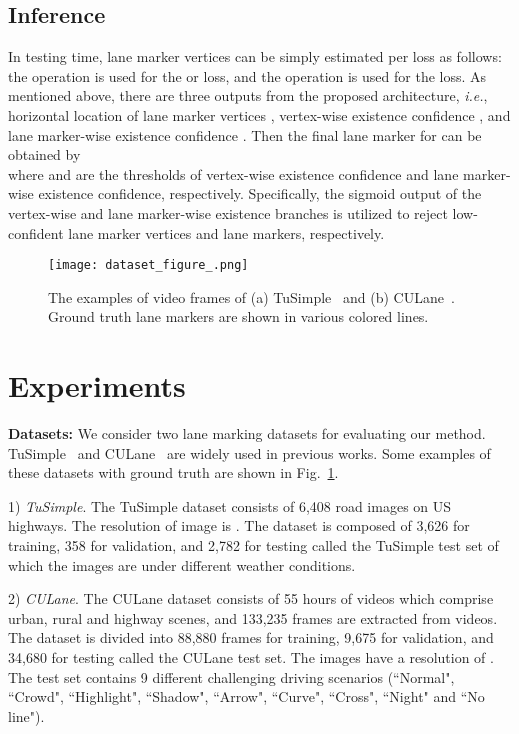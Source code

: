 \documentclass[10pt,twocolumn,letterpaper]{article}
\begin{document}
\subsection{Inference}
In testing time, lane marker vertices can be simply estimated per loss as follows: the  operation is used for the  or  loss, and the  operation is used for the  loss.
As mentioned above, there are three outputs from the proposed architecture, \textit{i.e.}, horizontal location of lane marker vertices , vertex-wise existence confidence , and lane marker-wise existence confidence . Then the final lane marker  for  can be obtained by
 \\
where  and  are the thresholds of vertex-wise existence confidence and lane marker-wise existence confidence, respectively. Specifically, the sigmoid output of the vertex-wise and lane marker-wise existence branches is utilized to reject low-confident lane marker vertices and lane markers, respectively.



\def\algorithmname{E2E-LMD}
\def\reductionname{HRM}
\def\reductionnames{HRMs}
\newcommand{\tablestyle}[2]{\setlength{\tabcolsep}{#1}\renewcommand{\arraystretch}{#2}\centering\footnotesize}

\begin{figure}[t]
	\centering
	\texttt{[image: dataset\_figure\_.png]}
	\caption{The examples of video frames of (a) TuSimple~\cite{tusimple} and (b) CULane~\cite{SpatialAsDeep}. Ground truth lane markers are shown in various colored lines.}
	\label{fig:dataset}
\end{figure}

\section{Experiments}

\textbf{Datasets:}  We consider two lane marking datasets for evaluating our method. TuSimple~\cite{tusimple} and CULane~\cite{SpatialAsDeep} are widely used in previous works. Some examples of these datasets with ground truth are shown in Fig.~\ref{fig:dataset}.

1) \textit{TuSimple}. The TuSimple dataset consists of 6,408 road images on US highways. The resolution of image is . The dataset is composed of 3,626 for training, 358 for validation, and 2,782 for testing called the TuSimple test set of which the images are under different weather conditions. 

2) \textit{CULane}. The CULane dataset consists of 55 hours of videos which comprise urban, rural and highway scenes, and 133,235 frames are extracted from videos. The dataset is divided into 88,880 frames for training, 9,675 for validation, and 34,680 for testing called the CULane test set. The images have a resolution of . The test set contains 9 different challenging driving scenarios (``Normal", ``Crowd", ``Highlight", ``Shadow", ``Arrow", ``Curve", ``Cross", ``Night" and ``No line").
\end{document}
